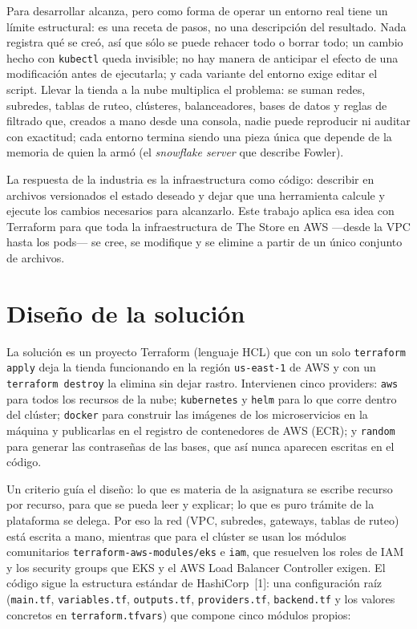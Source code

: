 \documentclass[11pt,a4paper]{article}
\newcommand{\code}[1]{\texttt{#1}}
\begin{document}
Para desarrollar alcanza, pero como forma de operar un entorno real tiene un límite
estructural: es una receta de pasos, no una descripción del resultado. Nada registra qué se
creó, así que sólo se puede rehacer todo o borrar todo; un cambio hecho con \code{kubectl}
queda invisible; no hay manera de anticipar el efecto de una modificación antes de ejecutarla;
y cada variante del entorno exige editar el script. Llevar la tienda a la nube multiplica el
problema: se suman redes, subredes, tablas de ruteo, clústeres, balanceadores, bases de datos y
reglas de filtrado que, creados a mano desde una consola, nadie puede reproducir ni auditar con
exactitud; cada entorno termina siendo una pieza única que depende de la memoria de quien la
armó (el \emph{snowflake server} que describe Fowler).

La respuesta de la industria es la infraestructura como código: describir en archivos
versionados el estado deseado y dejar que una herramienta calcule y ejecute los cambios
necesarios para alcanzarlo. Este trabajo aplica esa idea con Terraform para que toda la
infraestructura de The Store en AWS ---desde la VPC hasta los pods--- se cree, se modifique y
se elimine a partir de un único conjunto de archivos.

\section{Diseño de la solución}

La solución es un proyecto Terraform (lenguaje HCL) que con un solo \code{terraform apply}
deja la tienda funcionando en la región \code{us-east-1} de AWS y con un
\code{terraform destroy} la elimina sin dejar rastro. Intervienen cinco providers: \code{aws}
para todos los recursos de la nube; \code{kubernetes} y \code{helm} para lo que corre dentro
del clúster; \code{docker} para construir las imágenes de los microservicios en la máquina y
publicarlas en el registro de contenedores de AWS (ECR); y \code{random} para generar las
contraseñas de las bases, que así nunca aparecen escritas en el código.

Un criterio guía el diseño: lo que es materia de la asignatura se escribe recurso por
recurso, para que se pueda leer y explicar; lo que es puro trámite de la plataforma se delega.
Por eso la red (VPC, subredes, gateways, tablas de ruteo) está escrita a mano, mientras que
para el clúster se usan los módulos comunitarios \code{terraform-aws-modules/eks} e
\code{iam}, que resuelven los roles de IAM y los security groups que EKS y el AWS Load
Balancer Controller exigen. El código sigue la estructura estándar
de HashiCorp~[1]: una configuración raíz (\code{main.tf}, \code{variables.tf},
\code{outputs.tf}, \code{providers.tf}, \code{backend.tf} y los valores concretos en
\code{terraform.tfvars}) que compone cinco módulos propios:
\end{document}
